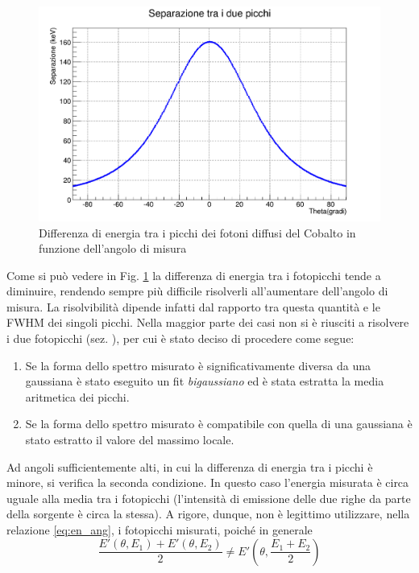 \documentclass[8pt]{extarticle}
\begin{document}
\begin{figure}
\includegraphics[width=\textwidth]{"distanza_picchi"}
\caption{Differenza di energia tra i picchi dei fotoni diffusi del Cobalto in funzione dell'angolo di misura}
\label{fig:dist_picchi}
\end{figure}

Come si può vedere in Fig. \ref{fig:dist_picchi} la differenza di energia tra i fotopicchi tende a diminuire, rendendo sempre più difficile risolverli all'aumentare dell'angolo di misura. La risolvibilità dipende infatti dal rapporto tra questa quantità e le FWHM dei singoli picchi. Nella maggior parte dei casi non si è riusciti a risolvere i due fotopicchi (sez. \cite{subsec:picchi}), per cui è stato deciso di procedere come segue:

\begin{enumerate}
\item Se la forma dello spettro misurato è significativamente diversa da una gaussiana è stato eseguito un fit \textit{bigaussiano} ed è stata estratta la media aritmetica dei picchi.
\item Se la forma dello spettro misurato è compatibile con quella di una gaussiana è stato estratto il valore del massimo locale.
\end{enumerate}

Ad angoli sufficientemente alti, in cui la differenza di energia tra i picchi è minore, si verifica la seconda condizione. In questo caso l'energia misurata è circa uguale alla media tra i fotopicchi (l'intensità di emissione delle due righe da parte della sorgente è circa la stessa). A rigore, dunque, non è legittimo utilizzare, nella relazione \eqref{eq:en_ang}, i fotopicchi misurati, poiché in generale \\
\begin{equation}
\frac{E'(\theta,E_1) + E'(\theta,E_2)}{2} \neq E'(\theta, \frac{E_1+E_2}{2})
\end{equation}
\end{document}
